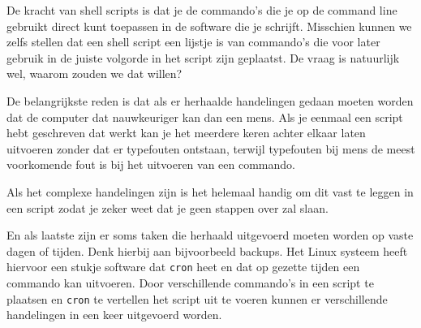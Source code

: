 De kracht van shell scripts is dat je de commando's die je op de command line gebruikt direct kunt toepassen in de software die je schrijft. Misschien kunnen we zelfs stellen dat een shell script een lijstje is van commando's die voor later gebruik in de juiste volgorde in het script zijn geplaatst. De vraag is natuurlijk wel, waarom zouden we dat willen?

De belangrijkste reden is dat als er herhaalde handelingen gedaan moeten worden dat de computer dat nauwkeuriger kan dan een mens. Als je eenmaal een script hebt geschreven dat werkt kan je het meerdere keren achter elkaar laten uitvoeren zonder dat er typefouten ontstaan, terwijl typefouten bij mens de meest voorkomende fout is bij het uitvoeren van een commando.

Als het complexe handelingen zijn is het helemaal handig om dit vast te leggen in een script zodat je zeker weet dat je geen stappen over zal slaan.

En als laatste zijn er soms taken die herhaald uitgevoerd moeten worden op vaste dagen of tijden. Denk hierbij aan bijvoorbeeld backups. Het Linux systeem heeft hiervoor een stukje software dat \texttt{cron} heet en dat op gezette tijden een commando kan uitvoeren. Door verschillende commando's in een script te plaatsen en \texttt{cron} te vertellen het script uit te voeren kunnen er verschillende handelingen in een keer uitgevoerd worden.
